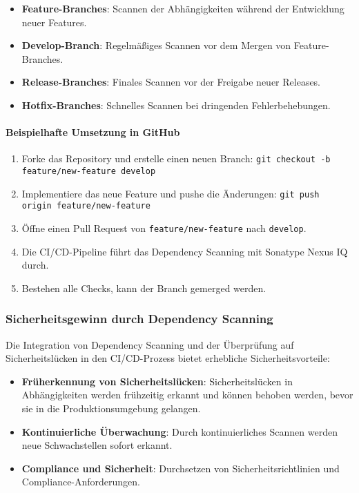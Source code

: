 \begin{itemize}
    \item \textbf{Feature-Branches}: Scannen der Abhängigkeiten während der Entwicklung neuer Features.
    \item \textbf{Develop-Branch}: Regelmäßiges Scannen vor dem Mergen von Feature-Branches.
    \item \textbf{Release-Branches}: Finales Scannen vor der Freigabe neuer Releases.
    \item \textbf{Hotfix-Branches}: Schnelles Scannen bei dringenden Fehlerbehebungen.
\end{itemize}

\paragraph{Beispielhafte Umsetzung in GitHub}

\begin{enumerate}
    \item Forke das Repository und erstelle einen neuen Branch: \texttt{git checkout -b feature/new-feature develop}
    \item Implementiere das neue Feature und pushe die Änderungen: \texttt{git push origin feature/new-feature}
    \item Öffne einen Pull Request von \texttt{feature/new-feature} nach \texttt{develop}.
    \item Die CI/CD-Pipeline führt das Dependency Scanning mit Sonatype Nexus IQ durch.
    \item Bestehen alle Checks, kann der Branch gemerged werden.
\end{enumerate}

\subsubsection{Sicherheitsgewinn durch Dependency Scanning}

Die Integration von Dependency Scanning und der Überprüfung auf Sicherheitslücken in den CI/CD-Prozess bietet erhebliche Sicherheitsvorteile:

\begin{itemize}
    \item \textbf{Früherkennung von Sicherheitslücken}: Sicherheitslücken in Abhängigkeiten werden frühzeitig erkannt und können behoben werden, bevor sie in die Produktionsumgebung gelangen.
    \item \textbf{Kontinuierliche Überwachung}: Durch kontinuierliches Scannen werden neue Schwachstellen sofort erkannt.
    \item \textbf{Compliance und Sicherheit}: Durchsetzen von Sicherheitsrichtlinien und Compliance-Anforderungen.
\end{itemize}

